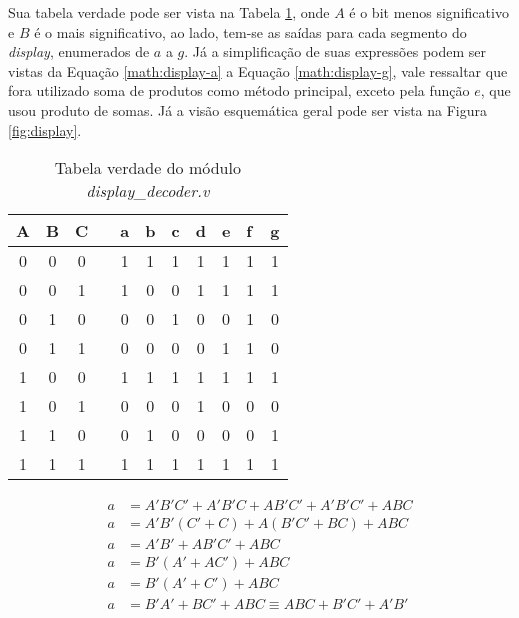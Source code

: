 \documentclass[
	article,			%
	11pt,				%
	oneside,			%
	a4paper,			%
	english,			%
	brazil,				%
	sumario=tradicional
	]{abntex2}
\begin{document}
Sua tabela verdade pode ser vista na Tabela \ref{tab:display-decoder}, onde $A$ é o bit menos significativo e $B$ é o mais significativo, ao lado, tem-se as saídas para cada segmento do \textit{display}, enumerados de $a$ a $g$. Já a simplificação de suas expressões podem ser vistas da Equação \eqref{math:display-a} a Equação \eqref{math:display-g}, vale ressaltar que fora utilizado soma de produtos como método principal, exceto pela função $e$, que usou produto de somas. Já a visão esquemática geral pode ser vista na Figura \ref{fig:display}.


\begin{table}[H]
\centering
\begin{tabular}{|c|c|c|c|c|c|c|c|c|c|c|}
\hline
A & B & C &  & a & b & \multicolumn{1}{l|}{c} & \multicolumn{1}{l|}{d} & \multicolumn{1}{l|}{e} & \multicolumn{1}{l|}{f} & \multicolumn{1}{l|}{g} \\ \hline
0 & 0 & 0 &  & 1 & 1 & 1 & 1 & 1 & 1 & 1 \\ \hline
0 & 0 & 1 &  & 1 & 0 & 0 & 1 & 1 & 1 & 1 \\ \hline
0 & 1 & 0 &  & 0 & 0 & 1 & 0 & 0 & 1 & 0 \\ \hline
0 & 1 & 1 &  & 0 & 0 & 0 & 0 & 1 & 1 & 0 \\ \hline
1 & 0 & 0 &  & 1 & 1 & 1 & 1 & 1 & 1 & 1 \\ \hline
1 & 0 & 1 &  & 0 & 0 & 0 & 1 & 0 & 0 & 0 \\ \hline
1 & 1 & 0 &  & 0 & 1 & 0 & 0 & 0 & 0 & 1 \\ \hline
1 & 1 & 1 &  & 1 & 1 & 1 & 1 & 1 & 1 & 1 \\ \hline
\end{tabular}
\caption{Tabela verdade do módulo \textit{display\_decoder.v}}
\label{tab:display-decoder}
\end{table}

\begin{equation}
\begin{split}
a &= A'B'C' + A'B'C + AB'C' + A'B'C' + ABC \\
a &= A'B'(C'+ C) + A(B'C' + BC) + ABC\\
a &= A'B' + AB'C' + ABC\\
a &= B'(A' + AC') + ABC\\
a &= B'(A' + C') + ABC\\
a &= B'A' + BC' + ABC \equiv ABC + B'C' + A'B'
\label{math:display-a}
\end{split}
\end{equation}
\end{document}
